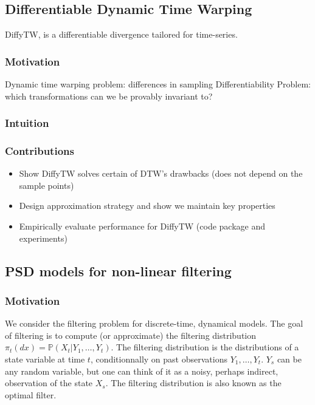 \newpage
\subsection{Differentiable Dynamic Time Warping}
DiffyTW, is a differentiable divergence tailored for time-series.

\subsubsection{Motivation}

Dynamic time warping problem: differences in sampling
Differentiability
Problem: which transformations can we be provably invariant to?

\subsubsection{Intuition}

\subsubsection{Contributions}
\begin{itemize}
\item Show DiffyTW solves certain of DTW's drawbacks (does not depend on the sample points)
\item Design approximation strategy and show we maintain key properties
\item Empirically evaluate performance for DiffyTW (code package and experiments)
\end{itemize}

\newpage
\subsection{PSD models for non-linear filtering}

\subsubsection{Motivation}
We consider the filtering problem for discrete-time, dynamical models. The goal of filtering is to compute (or approximate) the filtering distribution $\pi_t(dx) = \mathbb P(X_t\vert Y_1, \ldots, Y_{t})$. The filtering distribution is the distributions of a state variable at time $t$, conditionnally on past observations $Y_1, \ldots, Y_t$. $Y_s$ can be any random variable, but one can think of it as a noisy, perhaps indirect, observation of the state $X_s$. The filtering distribution is also known as the optimal filter.

